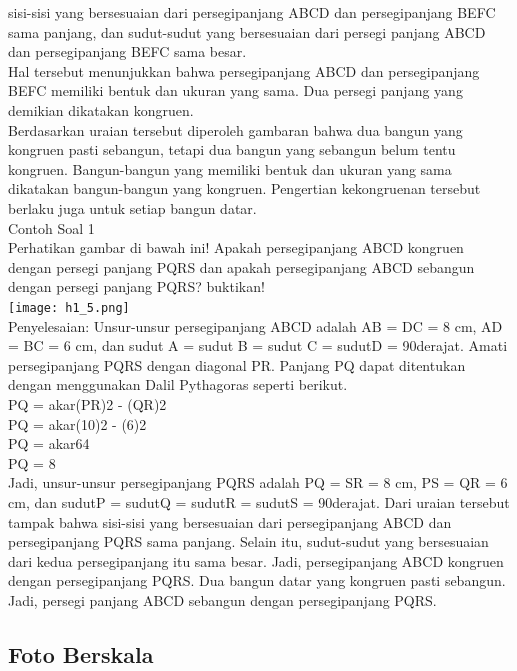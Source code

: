 \documentclass[11pt,fleqn]{book} %
\begin{document}
sisi-sisi yang bersesuaian dari persegipanjang ABCD dan persegipanjang BEFC sama panjang, dan
sudut-sudut yang bersesuaian dari persegi panjang ABCD dan persegipanjang BEFC sama besar.\\

Hal tersebut menunjukkan bahwa persegipanjang ABCD dan persegipanjang BEFC memiliki bentuk dan ukuran yang sama. Dua persegi panjang yang demikian dikatakan kongruen.\\

Berdasarkan uraian tersebut diperoleh gambaran bahwa dua bangun yang kongruen pasti sebangun, tetapi dua bangun yang sebangun belum tentu kongruen. Bangun-bangun yang memiliki bentuk dan ukuran yang sama dikatakan bangun-bangun yang kongruen. Pengertian kekongruenan tersebut berlaku juga untuk setiap bangun datar.\\

Contoh Soal 1\\
Perhatikan gambar di bawah ini! Apakah persegipanjang ABCD kongruen dengan persegi panjang PQRS dan  apakah persegipanjang ABCD sebangun dengan persegi panjang PQRS? buktikan!\\
 \texttt{[image: h1\_5.png]}\\
Penyelesaian:
Unsur-unsur persegipanjang ABCD adalah AB = DC = 8 cm, AD = BC = 6 cm, dan sudut A = sudut B = sudut C = sudutD = 90derajat. Amati persegipanjang PQRS dengan diagonal PR. Panjang PQ dapat ditentukan dengan menggunakan Dalil Pythagoras seperti berikut.\\
PQ = akar(PR)2 - (QR)2\\
PQ = akar(10)2 - (6)2\\
PQ = akar64\\
PQ = 8\\

Jadi, unsur-unsur persegipanjang PQRS adalah PQ = SR = 8 cm, PS = QR = 6 cm, dan sudutP = sudutQ = sudutR = sudutS = 90derajat.  Dari uraian tersebut tampak bahwa sisi-sisi yang bersesuaian dari persegipanjang ABCD dan persegipanjang PQRS sama panjang. Selain itu, sudut-sudut yang bersesuaian dari kedua persegipanjang itu sama besar. Jadi, persegipanjang ABCD kongruen dengan persegipanjang PQRS. Dua bangun datar yang kongruen pasti sebangun. Jadi, persegi panjang ABCD sebangun dengan persegipanjang PQRS.\\

\subsection{Foto Berskala}
\end{document}
